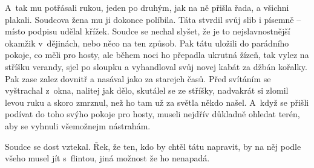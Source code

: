 A~tak mu potřásali rukou, jeden po druhým, jak na ně přišla řada, a všichni plakali. Soudcova žena mu ji dokonce políbila. Táta stvrdil svůj slib i písemně – místo podpisu udělal křížek. Soudce se nechal slyšet, že je to nejslavnostnější okamžik v~dějinách, nebo něco na ten způsob. Pak tátu uložili do parádního pokoje, co měli pro hosty, ale během noci ho přepadla ukrutná žízeň, tak vylez na stříšku verandy, sjel po sloupku a vyhandloval svůj novej kabát za džbán kořalky. Pak zase zalez dovnitř a nasával jako za starejch časů. Před svítáním se vyštrachal z~okna, nalitej jak dělo, skutálel se ze stříšky, nadvakrát si zlomil levou ruku a skoro zmrznul, než ho tam už za světla někdo našel. A~když se přišli podívat do toho svýho pokoje pro hosty, museli nejdřív důkladně ohledat terén, aby se vyhnuli všemožnejm nástrahám.

Soudce se dost vztekal. Řek, že ten, kdo by chtěl tátu napravit, by na něj podle všeho musel jít s flintou, jiná možnost že ho nenapadá. 

